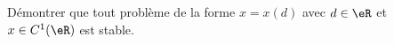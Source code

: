 
\begin{exercice}\label{exoSerieUn0001}

	 Démontrer que tout  problème de la forme $x=x(d)$ avec $d\in\eR$ et $x \in C^1(\eR)$ est stable.

\end{exercice}
